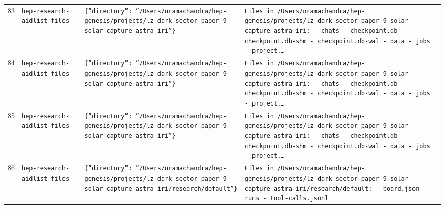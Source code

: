 \documentclass[11pt,a4paper]{article}
\begin{document}
\begin{longtable}{@{}p{}p{}p{}p{}@{}}
83 & \texttt{hep-research-aid}\newline\texttt{list\_\allowbreak{}files} & \texttt{\{''directory'':\allowbreak{} ''/\allowbreak{}Users/\allowbreak{}nramachandra/\allowbreak{}hep-genesis/\allowbreak{}projects/\allowbreak{}lz-dark-sector-paper-9-solar-capture-astra-iri''\}\allowbreak{}} & \texttt{Files in /\allowbreak{}Users/\allowbreak{}nramachandra/\allowbreak{}hep-genesis/\allowbreak{}projects/\allowbreak{}lz-dark-sector-paper-9-solar-capture-astra-iri:\allowbreak{}   - chats   - checkpoint.db   - checkpoint.db-shm   - checkpoint.db-wal   - data   - jobs   - project.\ldots{}\allowbreak{}} \\
84 & \texttt{hep-research-aid}\newline\texttt{list\_\allowbreak{}files} & \texttt{\{''directory'':\allowbreak{} ''/\allowbreak{}Users/\allowbreak{}nramachandra/\allowbreak{}hep-genesis/\allowbreak{}projects/\allowbreak{}lz-dark-sector-paper-9-solar-capture-astra-iri''\}\allowbreak{}} & \texttt{Files in /\allowbreak{}Users/\allowbreak{}nramachandra/\allowbreak{}hep-genesis/\allowbreak{}projects/\allowbreak{}lz-dark-sector-paper-9-solar-capture-astra-iri:\allowbreak{}   - chats   - checkpoint.db   - checkpoint.db-shm   - checkpoint.db-wal   - data   - jobs   - project.\ldots{}\allowbreak{}} \\
85 & \texttt{hep-research-aid}\newline\texttt{list\_\allowbreak{}files} & \texttt{\{''directory'':\allowbreak{} ''/\allowbreak{}Users/\allowbreak{}nramachandra/\allowbreak{}hep-genesis/\allowbreak{}projects/\allowbreak{}lz-dark-sector-paper-9-solar-capture-astra-iri''\}\allowbreak{}} & \texttt{Files in /\allowbreak{}Users/\allowbreak{}nramachandra/\allowbreak{}hep-genesis/\allowbreak{}projects/\allowbreak{}lz-dark-sector-paper-9-solar-capture-astra-iri:\allowbreak{}   - chats   - checkpoint.db   - checkpoint.db-shm   - checkpoint.db-wal   - data   - jobs   - project.\ldots{}\allowbreak{}} \\
86 & \texttt{hep-research-aid}\newline\texttt{list\_\allowbreak{}files} & \texttt{\{''directory'':\allowbreak{} ''/\allowbreak{}Users/\allowbreak{}nramachandra/\allowbreak{}hep-genesis/\allowbreak{}projects/\allowbreak{}lz-dark-sector-paper-9-solar-capture-astra-iri/\allowbreak{}research/\allowbreak{}default''\}\allowbreak{}} & \texttt{Files in /\allowbreak{}Users/\allowbreak{}nramachandra/\allowbreak{}hep-genesis/\allowbreak{}projects/\allowbreak{}lz-dark-sector-paper-9-solar-capture-astra-iri/\allowbreak{}research/\allowbreak{}default:\allowbreak{}   - board.json   - runs   - tool-calls.jsonl} \\

\end{longtable}
\end{document}
